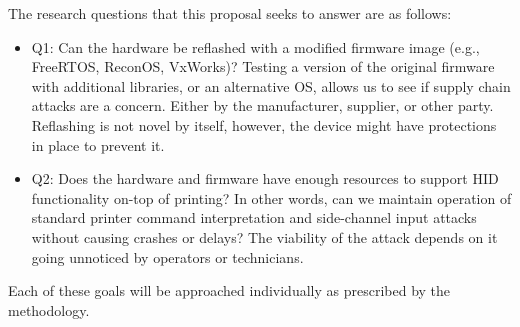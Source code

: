The research questions that this proposal seeks to answer are as follows:
\begin{itemize}
  \item Q1: Can the hardware be reflashed with a modified firmware image (e.g., FreeRTOS, ReconOS, VxWorks)? Testing a version of the original firmware with additional libraries, or an alternative OS, allows us to see if supply chain attacks are a concern. Either by the manufacturer, supplier, or other party. Reflashing is not novel by itself, however, the device might have protections in place to prevent it.  
  \item Q2: Does the hardware and firmware have enough resources to support HID functionality on-top of printing? In other words, can we maintain operation of standard printer command interpretation and side-channel input attacks without causing crashes or delays? The viability of the attack depends on it going unnoticed by operators or technicians. 
\end{itemize}

Each of these goals will be approached individually as prescribed by the methodology.